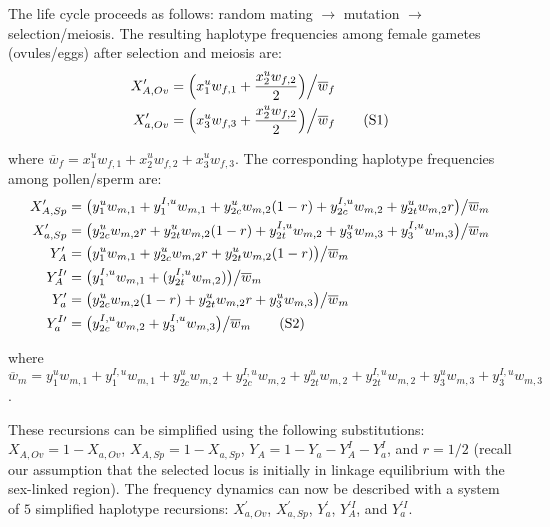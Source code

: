 \documentclass{article}
\newcommand\numberthis{\addtocounter{equation}{1}\tag{\theequation}}
\begin{document}
\begin{appendices}
The life cycle proceeds as follows: random mating $\rightarrow$ mutation $\rightarrow$ selection/meiosis. The resulting haplotype frequencies among female gametes (ovules/eggs) after selection and meiosis are:
\begin{align*}
	X_{A,Ov}^{\prime} &= \Big( x^u_{1} w_{f,1} + \frac{x^u_{2} w_{f,2} }{2} \Big) \Big/ \overline{w}_f \\
	X_{a,Ov}^{\prime} &= \Big( x^u_{3} w_{f,3} + \frac{x^u_{2} w_{f,2} }{2} \Big) \Big/ \overline{w}_f  \numberthis
\end{align*}

\noindent where $\overline{w}_f = x^u_{1} w_{f,1} + x^u_{2} w_{f,2} + x^u_{3} w_{f,3}$. The corresponding haplotype frequencies among pollen/sperm are:
\begin{align*}
	X^{\prime}_{A,Sp} &= \big(y^u_1 w_{m,1} + y^{I,u}_1 w_{m,1} + y^u_{2c} w_{m,2} (1 - r) + y^{I,u}_{2c} w_{m,2} + y^u_{2t} w_{m,2} r \big) \big/ \overline{w}_m \\
	X^{\prime}_{a,Sp} &= \big(y^u_{2c} w_{m,2} r + y^u_{2t} w_{m,2} (1 - r) + y^{I,u}_{2t} w_{m,2} + y^u_3 w_{m,3} + y^{I,u}_3 w_{m,3} \big) \big/ \overline{w}_m \\
	Y^{\prime}_{A} &= \big( y^u_1 w_{m,1} + y^u_{2c} w_{m,2} r + y^u_{2t} w_{m,2} (1 - r) \big) \big/ \overline{w}_m \\
	Y^{I \prime}_{A} &= \big( y^{I,u}_1 w_{m,1} + (y^{I,u}_{2t} w_{m,2}) \big) \big/ \overline{w}_m \\
	Y^{\prime}_{a} &= \big( y^u_{2c} w_{m,2} (1 - r) + y^u_{2t} w_{m,2} r + y^u_3 w_{m,3} \big) \big/ \overline{w}_m \\
	Y^{I \prime}_{a} &= \big( y^{I,u}_{2c} w_{m,2} + y^{I,u}_3 w_{m,3} \big) \big/ \overline{w}_m \numberthis
\end{align*}

\noindent where $\overline{w}_{m} = y^u_1 w_{m,1} + y^{I,u}_1 w_{m,1} + y^u_{2c} w_{m,2} + y^{I,u}_{2c} w_{m,2} + y^u_{2t} w_{m,2} + y^{I,u}_{2t} w_{m,2} + y^u_3 w_{m,3} + y^{I,u}_3 w_{m,3}$.

\bigskip

\noindent These recursions can be simplified using the following substitutions: $X_{A,Ov} = 1 - X_{a,Ov}$, $X_{A,Sp} = 1 - X_{a,Sp}$, $Y_{A} = 1 - Y_a - Y_A^I - Y_a^I$, and $r = 1/2$ (recall our assumption that the selected locus is initially in linkage equilibrium with the sex-linked region). The frequency dynamics can now be described with a system of $5$ simplified haplotype recursions: $X^{\prime}_{a,Ov}$, $X^{\prime}_{a,Sp}$, $Y^{\prime}_{a}$, $Y^{\prime I}_{A}$, and $Y^{\prime I}_{a}$.
\bigskip



\end{appendices}
\end{document}
